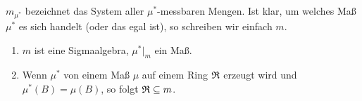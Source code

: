 			\begin{defi}
				$m_{\mu^*}$ bezeichnet das System aller $\mu^*$-messbaren Mengen. Ist klar, um welches Maß $\mu^*$ es sich handelt (oder das egal ist), so schreiben wir einfach $m$.
			\end{defi}
			
			\begin{satz}
				\begin{enumerate}
					\item $m$ ist eine Sigmaalgebra, $\mu^*|_m$ ein Maß.
					\item Wenn $\mu^*$ von einem Maß $\mu$ auf einem Ring $\mathfrak{R}$ erzeugt wird und $\mu^*(B)=\mu(B)$, so folgt $\mathfrak{R}\subseteq m$.
				\end{enumerate}  
			\end{satz}
			
